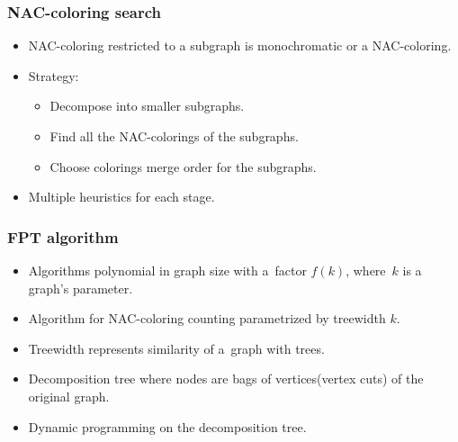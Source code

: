 \documentclass[aspectratio=\myaspectratio]{beamer}
\begin{document}
\begin{frame}
	\frametitle{NAC-coloring search}
	\begin{itemize}
		\item
		      NAC-coloring restricted to a subgraph
		      is monochromatic or a NAC-coloring.
		\item
		      Strategy:
		      \begin{itemize}
			      \item
			            Decompose into smaller subgraphs.
			      \item
			            Find all the NAC-colorings of the subgraphs.
			      \item
			            Choose colorings merge order for the subgraphs.
		      \end{itemize}
		\item
		      Multiple heuristics for each stage.
	\end{itemize}
\end{frame}

\begin{frame}
	\frametitle{}

\end{frame}
\begin{frame}
	\frametitle{}

\end{frame}
\begin{frame}
	\frametitle{}

\end{frame}
\begin{frame}
	\frametitle{}

\end{frame}
\begin{frame}
	\frametitle{}

\end{frame}

\begin{frame}
	\frametitle{FPT algorithm}
	\begin{itemize}
		\item
		      Algorithms polynomial in graph size with a factor \( f(k) \), where~\( k \) is a graph's parameter.
		\item
		      Algorithm for NAC-coloring counting parametrized by treewidth \( k \).
		\item
		      Treewidth represents similarity of a graph with trees.
		\item
		      Decomposition tree where nodes are bags of vertices\newline{}(vertex cuts) of the original graph.
		\item
		      Dynamic programming on the decomposition tree.
	\end{itemize}
\end{frame}
\end{document}

